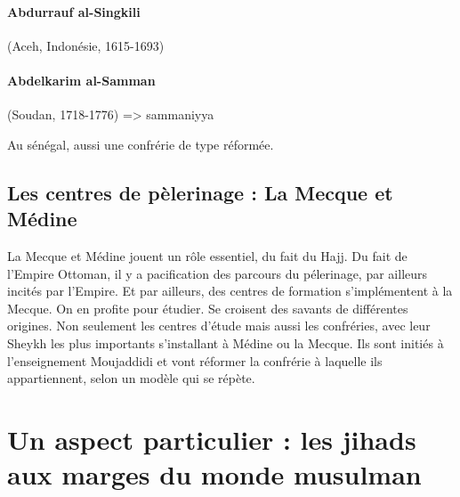 \paragraph{Abdurrauf al-Singkili} (Aceh, Indonésie, 1615-1693)

\paragraph{Abdelkarim al-Samman} (Soudan, 1718-1776) => sammaniyya

Au sénégal, aussi une confrérie de type réformée. 




\subsection{Les centres de pèlerinage : La Mecque et Médine}

La Mecque et Médine jouent un rôle essentiel, du fait du Hajj. Du fait de l'Empire Ottoman, il y a pacification des parcours du pélerinage, par ailleurs incités par l'Empire.
Et par ailleurs, des centres de formation s'implémentent à la Mecque.  On en profite pour étudier. Se croisent des savants de différentes origines.
Non seulement les centres d'étude mais aussi les confréries, avec leur Sheykh les plus importants s'installant à Médine ou la Mecque. Ils sont initiés à l'enseignement Moujaddidi et vont réformer la confrérie à laquelle ils appartiennent, selon un modèle qui se répète.




\section{Un aspect particulier : les jihads aux marges du monde   musulman} 


